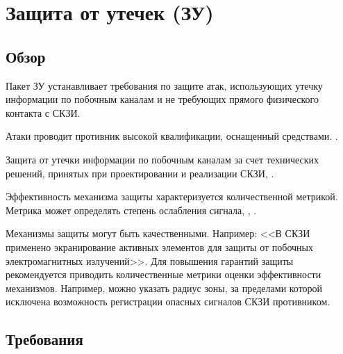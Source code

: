 \section{Защита от утечек (ЗУ)}\label{NI}

\subsection{Обзор}\label{NI.Intro}

Пакет ЗУ устанавливает требования по защите  атак, 
использующих утечку информации по побочным каналам и не требующих прямого 
физического контакта с СКЗИ.

Атаки проводит противник высокой квалификации, оснащенный 
 средствами. 
.

Защита от утечки информации по побочным каналам  
за счет технических решений, принятых при проектировании и реализации СКЗИ, 
.

Эффективность механизма защиты характеризуется количественной метрикой.
Метрика может определять степень ослабления сигнала, , 
.
%

Механизмы защиты могут быть качественными. Например: 
<<В СКЗИ применено экранирование активных элементов для защиты от побочных 
электромагнитных излучений>>. 
%
Для повышения гарантий защиты рекомендуется приводить количественные метрики 
оценки эффективности механизмов. Например, можно указать радиус зоны, 
за пределами которой исключена возможность регистрации опасных сигналов 
СКЗИ противником.
\fi

\subsection{Требования}\label{NI.Reqs}

